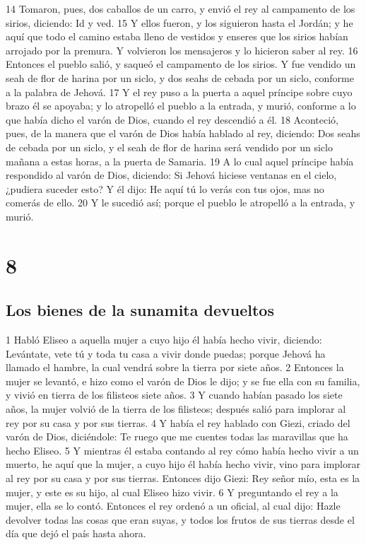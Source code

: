 14 Tomaron, pues, dos caballos de un carro, y envió el rey al campamento de los sirios, diciendo: Id y ved.
15 Y ellos fueron, y los siguieron hasta el Jordán; y he aquí que todo el camino estaba lleno de vestidos y enseres que los sirios habían arrojado por la premura. Y volvieron los mensajeros y lo hicieron saber al rey.
16 Entonces el pueblo salió, y saqueó el campamento de los sirios. Y fue vendido un seah   de flor de harina por un siclo, y dos seahs de cebada por un siclo, conforme a la palabra de Jehová.
17 Y el rey puso a la puerta a aquel príncipe sobre cuyo brazo él se apoyaba; y lo atropelló el pueblo a la entrada, y murió, conforme a lo que había dicho el varón de Dios, cuando el rey descendió a él.
18 Aconteció, pues, de la manera que el varón de Dios había hablado al rey, diciendo: Dos seahs   de cebada por un siclo, y el seah de flor de harina será vendido por un siclo mañana a estas horas, a la puerta de Samaria.
19 A lo cual aquel príncipe había respondido al varón de Dios, diciendo: Si Jehová hiciese ventanas en el cielo, ¿pudiera suceder esto? Y él dijo: He aquí tú lo verás con tus ojos, mas no comerás de ello. 
20 Y le sucedió así; porque el pueblo le atropelló a la entrada, y murió.

\chapter{8}

\section*{Los bienes de la sunamita devueltos}


1 Habló Eliseo a aquella mujer a cuyo hijo él había hecho vivir, diciendo: Levántate, vete tú y toda tu casa a vivir donde puedas; porque Jehová ha llamado el hambre, la cual vendrá sobre la tierra por siete años.
2 Entonces la mujer se levantó, e hizo como el varón de Dios le dijo; y se fue ella con su familia, y vivió en tierra de los filisteos siete años.
3 Y cuando habían pasado los siete años, la mujer volvió de la tierra de los filisteos; después salió para implorar al rey por su casa y por sus tierras.
4 Y había el rey hablado con Giezi, criado del varón de Dios, diciéndole: Te ruego que me cuentes todas las maravillas que ha hecho Eliseo.
5 Y mientras él estaba contando al rey cómo había hecho vivir a un muerto, he aquí que la mujer, a cuyo hijo él había hecho vivir, vino para implorar al rey por su casa y por sus tierras. Entonces dijo Giezi: Rey señor mío, esta es la mujer, y este es su hijo, al cual Eliseo hizo vivir.
6 Y preguntando el rey a la mujer, ella se lo contó. Entonces el rey ordenó a un oficial, al cual dijo: Hazle devolver todas las cosas que eran suyas, y todos los frutos de sus tierras desde el día que dejó el país hasta ahora.

